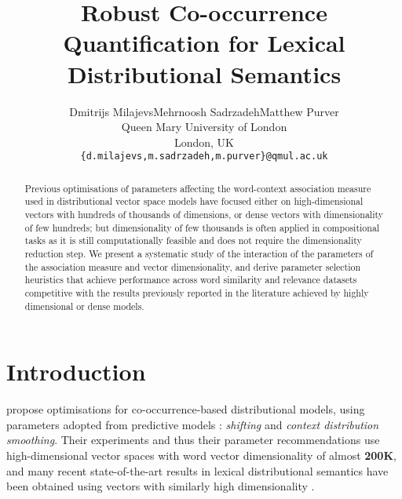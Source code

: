 \documentclass[11pt]{article}
\title{Robust Co-occurrence Quantification for Lexical Distributional Semantics}
\author{Dmitrijs Milajevs\qquad{}Mehrnoosh Sadrzadeh\qquad{}Matthew Purver\\
  Queen Mary University of London\\
  London, UK\\
  {\tt \{d.milajevs,m.sadrzadeh,m.purver\}@qmul.ac.uk}
}
\date{}
\begin{document}
\def\PMI/{$\operatorname{1PMI}$}
\def\SPMI/{$\operatorname{1SPMI}$}
\def\CPMI/{$\operatorname{1CPMI}$}
\def\SCPMI/{$\operatorname{1SCPMI}$}

\def\NPMI/{$\operatorname{nPMI}$}
\def\NSPMI/{$\operatorname{nSPMI}$}
\def\NCPMI/{$\operatorname{nCPMI}$}
\def\NSCPMI/{$\operatorname{nSCPMI}$}

\def\logNPMI/{$\operatorname{lognPMI}$}
\def\logNSPMI/{$\operatorname{lognSPMI}$}
\def\logNCPMI/{$\operatorname{lognCPMI}$}
\def\logNSCPMI/{$\operatorname{lognSCPMI}$}

\maketitle
\begin{abstract}
Previous optimisations of parameters affecting the word-context association measure used in distributional vector space models have focused either on high-dimensional vectors with hundreds of thousands of dimensions, or dense vectors with dimensionality of few hundreds; but dimensionality of few thousands is often applied in compositional tasks as it is still computationally feasible and does not require the dimensionality reduction step. We present a systematic study of the interaction of the parameters of the association measure and vector dimensionality, and derive parameter selection heuristics that achieve performance across word similarity and relevance datasets competitive with the results previously reported in the literature achieved by highly dimensional or dense models.
\end{abstract}

\section{Introduction}
\label{sec:introduction}

 propose optimisations for co-occurrence-based distributional models, using parameters adopted from predictive models \cite{mikolov2013efficient}: \emph{shifting} and \emph{context distribution smoothing}. Their experiments and thus their parameter  recommendations use high-dimensional vector spaces with word vector dimensionality of almost \textbf{200K}, and many recent state-of-the-art results in lexical distributional semantics have been obtained using vectors with similarly high dimensionality  \cite{baroni-dinu-kruszewski:2014:P14-1,kiela-clark:2014:CVSC,lapesa2014large}.
\end{document}
